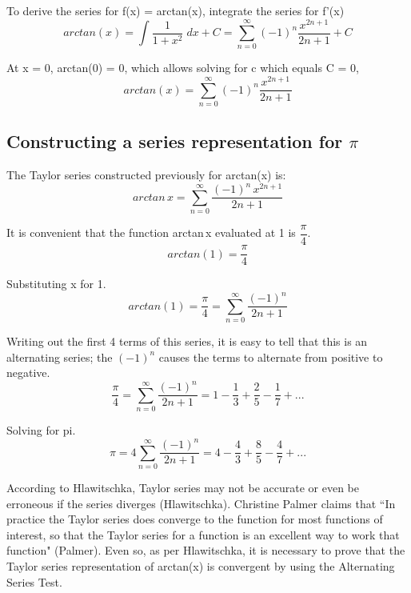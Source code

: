 \documentclass[12pt, titlepage]{article}
\begin{document}
To derive the series for f(x) = arctan(x), integrate the series for f'(x)
\begin{equation}
    arctan(x) = \int \frac{1}{1+x^{2}} \; dx + C = \sum_{n=0}^{\infty} (-1)^{n}\frac{x^{2n+1}}{2n+1} + C
\end{equation}

At x = 0, arctan(0) = 0, which allows solving for c which equals C = 0,
\begin{equation}
    arctan(x) = \sum_{n=0}^{\infty} (-1)^{n}\frac{x^{2n+1}}{2n+1} 
\end{equation}

\subsection{Constructing a series representation for \(\pi\)}
The Taylor series constructed previously for arctan(x) is:
\begin{equation}
    arctan\,x = \sum^{\infty}_{n=0} \frac{(-1)^{n}\,x^{2n+1}}{2n+1}
\end{equation}

It is convenient that the function arctan\,x evaluated at 1 is \(\dfrac{\pi}{4}\).
\begin{equation}
    arctan(1) = \frac{\pi}{4}
\end{equation}

Substituting x for 1.
\begin{equation}
    arctan(1) = \frac{\pi}{4} = \sum_{n=0}^\infty{ \frac{(-1)^n}{2n+1}}
\end{equation}

Writing out the first 4 terms of this series, it is easy to tell that this is an alternating series; the \((-1)^{n}\) causes the terms to alternate from positive to negative.
\begin{equation}
    \frac{\pi}{4} =\sum_{n=0}^\infty{ \frac{(-1)^n}{2n+1} = 1 - \frac{1}{3} + \frac{2}{5} - \frac{1}{7} + ... }
\end{equation}

Solving for pi.
\begin{equation}
    \pi = 4 \sum_{n=0}^\infty{ \frac{(-1)^n}{2n+1} = 4 - \frac{4}{3} + \frac{8}{5} - \frac{4}{7} + ... }
\end{equation}

According to Hlawitschka, Taylor series may not be accurate or even be erroneous if the series diverges (Hlawitschka). Christine Palmer claims that ``In practice the Taylor series does converge to the function for most functions of interest, so that the Taylor series for a function is an excellent way to work that function" (Palmer). Even so, as per Hlawitschka, it is necessary to prove that the Taylor series representation of arctan(x) is convergent by using the Alternating Series Test.
\end{document}

